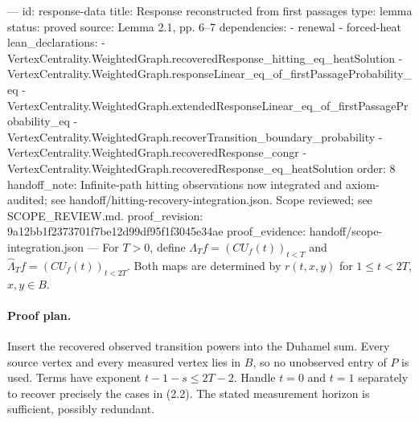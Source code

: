 ---
id: response-data
title: Response reconstructed from first passages
type: lemma
status: proved
source: Lemma 2.1, pp. 6–7
dependencies:
- renewal
- forced-heat
lean_declarations:
- VertexCentrality.WeightedGraph.recoveredResponse_hitting_eq_heatSolution
- VertexCentrality.WeightedGraph.responseLinear_eq_of_firstPassageProbability_eq
- VertexCentrality.WeightedGraph.extendedResponseLinear_eq_of_firstPassageProbability_eq
- VertexCentrality.WeightedGraph.recoverTransition_boundary_probability
- VertexCentrality.WeightedGraph.recoveredResponse_congr
- VertexCentrality.WeightedGraph.recoveredResponse_eq_heatSolution
order: 8
handoff_note: Infinite-path hitting observations now integrated and axiom-audited; see handoff/hitting-recovery-integration.json. Scope reviewed; see SCOPE_REVIEW.md.
proof_revision: 9a12bb1f2373701f7be12d99df95f1f3045e34ae
proof_evidence: handoff/scope-integration.json
---
For $T>0$, define $\Lambda_T f=(CU_f(t))_{t<T}$ and $\widehat\Lambda_T f=(CU_f(t))_{t<2T}$. Both maps are determined by $r(t,x,y)$ for $1\leq t<2T$, $x,y\in B$.

\paragraph{Proof plan.}
Insert the recovered observed transition powers into the Duhamel sum. Every source vertex and every measured vertex lies in $B$, so no unobserved entry of $P$ is used. Terms have exponent $t-1-s\leq2T-2$. Handle $t=0$ and $t=1$ separately to recover precisely the cases in (2.2). The stated measurement horizon is sufficient, possibly redundant.
